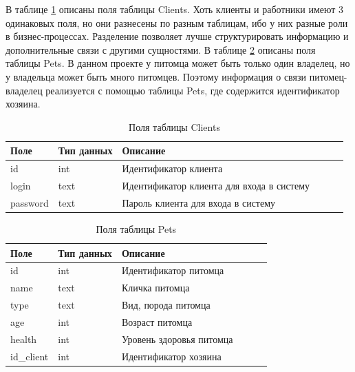 В таблице \ref{tab:clients}  описаны поля таблицы Clients. Хоть клиенты и работники имеют 3 одинаковых поля, но они разнесены по разным таблицам, ибо у них разные роли в бизнес-процессах. Разделение позволяет лучше структурировать информацию и дополнительные связи с другими сущностями. В таблице \ref{tab:pets}  описаны поля таблицы Pets. В данном проекте у питомца может быть только один владелец, но у владельца может быть много питомцев. Поэтому информация о связи питомец-владелец реализуется с помощью таблицы Pets, где содержится идентификатор хозяина. 

\begin{table}[hbtp]
	\begin{center}
		\captionsetup{justification=raggedright, singlelinecheck=false}
		\caption{\label{tab:clients}Поля таблицы Clients}
		
		\begin{tabular}{|l|l|l|l|l|l|}
			\hline {Поле} & {Тип данных} & {Описание}  \\ \hline
		id  & int & Идентификатор клиента   \\ \hline
		login & text & Идентификатор клиента для входа в систему \\ \hline
		password & text & Пароль клиента для входа в систему  \\ \hline
		\end{tabular}
	\end{center}
\end{table}

\begin{table}[hbtp]
	\begin{center}
			\captionsetup{justification=raggedright, singlelinecheck=false}
			\caption{\label{tab:pets}Поля таблицы Pets}
		\begin{tabular}{|l|l|l|l|l|l|}
			\hline {Поле} & {Тип данных} & {Описание}  \\ \hline
			id  & int & Идентификатор питомца   \\ \hline
			name & text & Кличка питомца \\ \hline
			type & text & Вид, порода питомца  \\ \hline
			age & int & Возраст питомца \\ \hline
			health & int & Уровень здоровья питомца  \\ \hline
			id\_client & int & Идентификатор хозяина  \\ \hline
		\end{tabular}
	\end{center}
\end{table}

